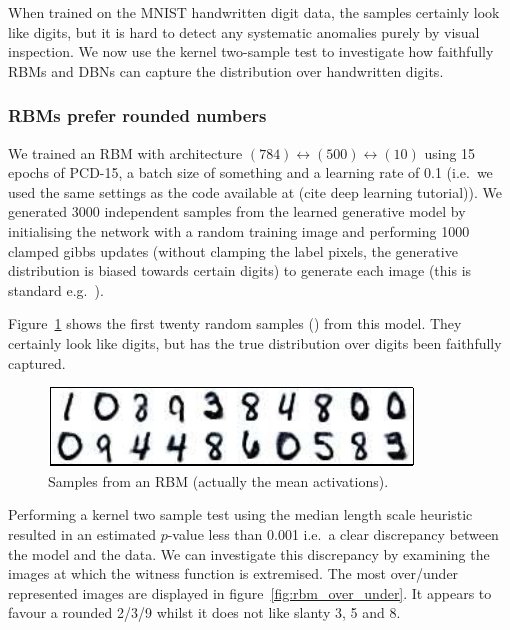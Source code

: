 \documentclass{article}
\def\ie{i.e.\ }
\def\eg{e.g.\ }
\begin{document}
When trained on the MNIST handwritten digit data, the samples certainly look like digits, but it is hard to detect any systematic anomalies purely by visual inspection.
We now use the kernel two-sample test to investigate how faithfully RBMs and DBNs can capture the distribution over handwritten digits.

\subsubsection{RBMs prefer rounded numbers}

We trained an RBM with architecture $(784)\leftrightarrow(500)\leftrightarrow(10)$ using 15 epochs of PCD-15, a batch size of something and a learning rate of 0.1 (\ie we used the same settings as the code available at (cite deep learning tutorial)).
We generated 3000 independent samples from the learned generative model by initialising the network with a random training image and performing 1000 clamped gibbs updates (without clamping the label pixels, the generative distribution is biased towards certain digits) to generate each image (this is standard \eg \cite{Hinton2007}).

Figure~\ref{fig:rbm_samples} shows the first twenty random samples () from this model.
They certainly look like digits, but has the true distribution over digits been faithfully captured.

\begin{figure}[ht]
\centering
\includegraphics[width=0.98\columnwidth]{figures/rbm_samples}
\caption{
Samples from an RBM (actually the mean activations).
}
\label{fig:rbm_samples}
\end{figure}

Performing a kernel two sample test using the median length scale heuristic resulted in an estimated $p$-value less than 0.001 \ie a clear discrepancy between the model and the data.
We can investigate this discrepancy by examining the images at which the witness function is extremised.
The most over/under represented images are displayed in figure~\ref{fig:rbm_over_under}.
It appears to favour a rounded 2/3/9 whilst it does not like slanty 3, 5 and 8.
\end{document}
